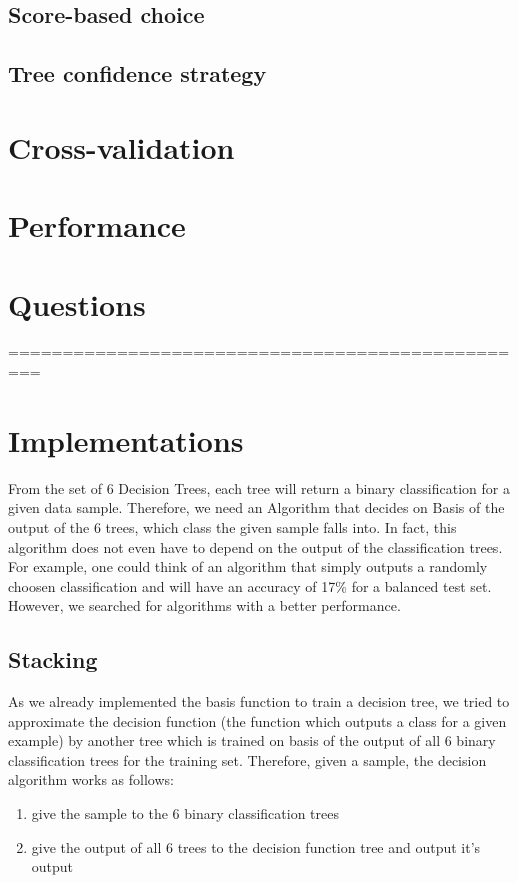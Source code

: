 \documentclass{article}
\begin{document}
\subsection{Score-based choice}

\subsection{Tree confidence strategy}

\section{Cross-validation}


\section{Performance}


\section{Questions}





=================================================
\section{Implementations}
From the set of 6 Decision Trees, each tree will return a binary classification for a given data sample. Therefore, we need an Algorithm that decides on Basis of the output of the 6 trees, which class the given sample falls into. In fact, this algorithm does not even have to depend on the output of the classification trees. For example, one could think of an algorithm that simply outputs a randomly choosen classification and will have an accuracy of 17\% for a balanced test set. However, we searched for algorithms with a better performance.


\subsection{Stacking}
As we already implemented the basis function to train a decision tree, we tried to approximate the decision function (the function which outputs a class for a given example) by another tree which is trained on basis of the output of all 6 binary classification trees for the training set.
Therefore, given a sample, the decision algorithm works as follows:
\begin{enumerate}
    \item give the sample to the 6 binary classification trees
    \item give the output of all 6 trees to the decision function tree and output it's output
\end{enumerate} 
\end{document}

